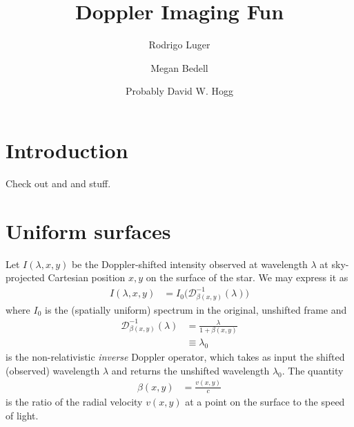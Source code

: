 \documentclass[modern]{aastex62}
\begin{document}
\title{Doppler Imaging Fun}

\author[0000-0002-0296-3826]{Rodrigo Luger}
%
\author{Megan Bedell}
%
\author{Probably David W. Hogg}

%
\section{Introduction}
Check out \citet{Luger2019} and \citet{Bedell2019} and stuff.

%
\section{Uniform surfaces}
\label{sec:uniform surfaces}

Let $I(\lambda, x, y)$ be the Doppler-shifted intensity observed at wavelength $\lambda$ at
sky-projected Cartesian position $x, y$ on the surface of the star. We may express it as
%
\begin{align}
    \label{eq:IntensityUnif}
    I(\lambda, x, y) &= I_0\Big(\mathcal{D}^{-1}_{\beta(x, y)}(\lambda)\Big)
\end{align}
%
where $I_0$ is the (spatially uniform) spectrum in the original, unshifted frame
and 
%
\begin{align}
    \mathcal{D}^{-1}_{\beta(x, y)}(\lambda) &= \frac{\lambda}{1 + \beta(x, y)} \nonumber \\
                                            &\equiv \lambda_0
\end{align}
%
is the non-relativistic \emph{inverse} Doppler operator, which takes as input the shifted (observed)
wavelength $\lambda$ and returns the unshifted wavelength $\lambda_0$.
The quantity
%
\begin{align}
    \beta(x, y) &= \frac{v(x, y)}{c}
\end{align}
%
is the ratio of the radial velocity $v(x, y)$ at a point on the
surface to the speed of light.
\end{document}
